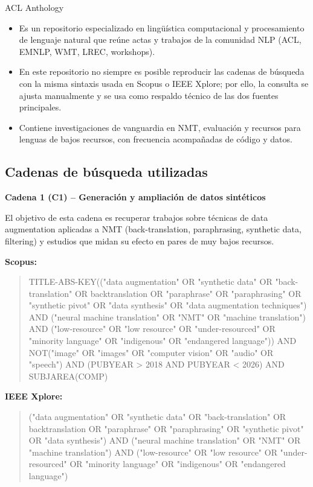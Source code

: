 \documentclass[12pt,a4paper,oneside]{book}
\begin{document}
ACL Anthology

\begin{itemize}
\item
  Es un repositorio especializado en lingüística computacional y procesamiento de lenguaje natural que reúne actas y trabajos de la comunidad NLP (ACL, EMNLP, WMT, LREC, workshops).
\item
  En este repositorio no siempre es posible reproducir las cadenas de búsqueda con la misma sintaxis usada en Scopus o IEEE Xplore; por ello, la consulta se ajusta manualmente y se usa como respaldo técnico de las dos fuentes principales.
\item
  Contiene investigaciones de vanguardia en NMT, evaluación y recursos para lenguas de bajos recursos, con frecuencia acompañadas de código y datos.
\end{itemize}

\subsection{Cadenas de búsqueda utilizadas}\label{cadenas-de-buxfasqueda-a-usar}

\textbf{Cadena 1 (C1) -- Generación y ampliación de datos sintéticos}

El objetivo de esta cadena es recuperar trabajos sobre técnicas de data augmentation aplicadas a NMT (back-translation, paraphrasing, synthetic data, filtering) y estudios que midan su efecto en pares de muy bajos recursos.

\noindent\textbf{Scopus:}
\begin{quote}\small\sloppy
TITLE-ABS-KEY(("data augmentation" OR "synthetic data" OR "back-translation" OR backtranslation OR "paraphrase" OR "paraphrasing" OR "synthetic pivot" OR "data synthesis" OR "data augmentation techniques") AND ("neural machine translation" OR "NMT" OR "machine translation") AND ("low-resource" OR "low resource" OR "under-resourced" OR "minority language" OR "indigenous" OR "endangered language")) AND NOT("image" OR "images" OR "computer vision" OR "audio" OR "speech") AND (PUBYEAR \textgreater{} 2018 AND PUBYEAR \textless{} 2026) AND SUBJAREA(COMP)
\end{quote}

\noindent\textbf{IEEE Xplore:}
\begin{quote}\small\sloppy
("data augmentation" OR "synthetic data" OR "back-translation" OR backtranslation OR "paraphrase" OR "paraphrasing" OR "synthetic pivot" OR "data synthesis") AND ("neural machine translation" OR "NMT" OR "machine translation") AND ("low-resource" OR "low resource" OR "under-resourced" OR "minority language" OR "indigenous" OR "endangered language")
\end{quote}
\end{document}
